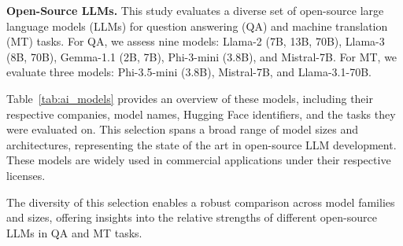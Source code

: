 
\textbf{Open-Source LLMs.} This study evaluates a diverse set of open-source large language models (LLMs) for question answering (QA) and machine translation (MT) tasks. For QA, we assess nine models: Llama-2 (7B, 13B, 70B), Llama-3 (8B, 70B), Gemma-1.1 (2B, 7B), Phi-3-mini (3.8B), and Mistral-7B. For MT, we evaluate three models: Phi-3.5-mini (3.8B), Mistral-7B, and Llama-3.1-70B.

Table~\ref{tab:ai_models} provides an overview of these models, including their respective companies, model names, Hugging Face identifiers, and the tasks they were evaluated on. This selection spans a broad range of model sizes and architectures, representing the state of the art in open-source LLM development. These models are widely used in commercial applications under their respective licenses.

The diversity of this selection enables a robust comparison across model families and sizes, offering insights into the relative strengths of different open-source LLMs in QA and MT tasks.

